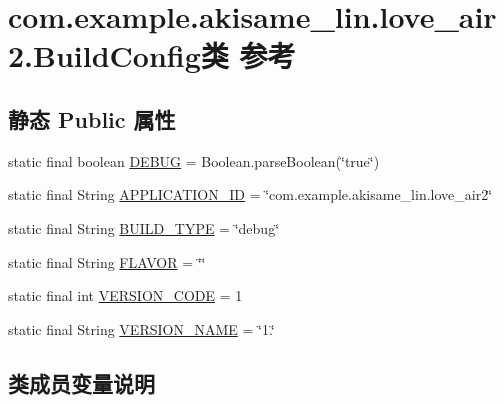 \hypertarget{classcom_1_1example_1_1akisame__lin_1_1love__air2_1_1_build_config}{}\section{com.\+example.\+akisame\+\_\+lin.\+love\+\_\+air2.\+Build\+Config类 参考}
\label{classcom_1_1example_1_1akisame__lin_1_1love__air2_1_1_build_config}
\subsection*{静态 Public 属性}
\begin{DoxyCompactItemize}
\item 
static final boolean \mbox{\hyperlink{classcom_1_1example_1_1akisame__lin_1_1love__air2_1_1_build_config_af629ed66688516e4ead43509d835e6fc}{D\+E\+B\+UG}} = Boolean.\+parse\+Boolean(\char`\"{}true\char`\"{})
\item 
static final String \mbox{\hyperlink{classcom_1_1example_1_1akisame__lin_1_1love__air2_1_1_build_config_a66eb47d4322f510bae558db90ed6248f}{A\+P\+P\+L\+I\+C\+A\+T\+I\+O\+N\+\_\+\+ID}} = \char`\"{}com.\+example.\+akisame\+\_\+lin.\+love\+\_\+air2\char`\"{}
\item 
static final String \mbox{\hyperlink{classcom_1_1example_1_1akisame__lin_1_1love__air2_1_1_build_config_a838095279c75ecf32bb84a3403ca4f3d}{B\+U\+I\+L\+D\+\_\+\+T\+Y\+PE}} = \char`\"{}debug\char`\"{}
\item 
static final String \mbox{\hyperlink{classcom_1_1example_1_1akisame__lin_1_1love__air2_1_1_build_config_ae11cf85e10ab8746368b04ac4c9b387f}{F\+L\+A\+V\+OR}} = \char`\"{}\char`\"{}
\item 
static final int \mbox{\hyperlink{classcom_1_1example_1_1akisame__lin_1_1love__air2_1_1_build_config_afff29248e8d2a3ca2c680a5666077eb7}{V\+E\+R\+S\+I\+O\+N\+\_\+\+C\+O\+DE}} = 1
\item 
static final String \mbox{\hyperlink{classcom_1_1example_1_1akisame__lin_1_1love__air2_1_1_build_config_a851c711fbc7879cee9a1cf6f37d3dafa}{V\+E\+R\+S\+I\+O\+N\+\_\+\+N\+A\+ME}} = \char`\"{}1.\char`\"{}
\end{DoxyCompactItemize}


\subsection{类成员变量说明}
\mbox{\label{classcom_1_1example_1_1akisame__lin_1_1love__air2_1_1_build_config_a66eb47d4322f510bae558db90ed6248f}} 
